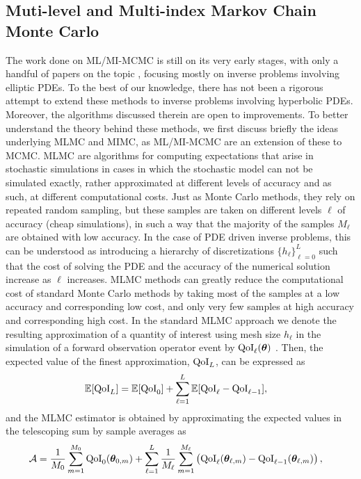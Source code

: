 \subsection{Muti-level and Multi-index Markov Chain Monte Carlo}
The work done on ML/MI-MCMC is still on its very early stages, with only a handful of papers on the topic \cite{dodwell2015hierarchical,hoang2013complexity,jasra2018multi} , focusing mostly on inverse problems involving elliptic PDEs. To the best of our knowledge, there has not been a rigorous attempt to extend these methods to inverse problems involving hyperbolic PDEs. Moreover, the algorithms discussed therein are open to improvements. To better understand the theory behind these methods, we first discuss briefly the ideas underlying  MLMC and MIMC, as ML/MI-MCMC are an extension of these to MCMC.  MLMC are algorithms for computing expectations that arise in stochastic simulations in cases in which the stochastic model can not be simulated exactly, rather approximated at different levels of accuracy and as such, at different computational costs. Just as Monte Carlo methods, they rely on repeated random sampling, but these samples are taken on different levels $\ell$ of accuracy (cheap simulations), in such a way that the majority of the samples $M_\ell$ are obtained with low accuracy. In the case of PDE driven inverse problems, this can be understood as introducing a hierarchy of discretizations $\{h_\ell\}_{\ell=0}^L$ such that the cost of solving the PDE and the accuracy of the numerical solution increase as $\ell$ increases. %
 MLMC methods can greatly reduce the computational cost of standard Monte Carlo methods by taking most of the samples at a low accuracy and corresponding low cost, and only very few samples  at high accuracy and corresponding high cost.   In the standard MLMC approach we denote the resulting approximation of a quantity of interest using mesh size $h_\ell$ in the simulation of a forward observation  operator event by $\text{QoI}_\ell(\bm{\theta})$ . Then, the expected value of the finest approximation, $\text{QoI}_L$, can be expressed as
\begin{align*}
\mathbb{E}[{\text{QoI}_L}] & =
\mathbb{E}[\text{QoI}_0] + \sum_{\ell=1}^L \mathbb{E}[\text{QoI}_{\ell}-\text{QoI}_{\ell-1}],
\end{align*}
and the MLMC estimator is obtained by approximating the expected values
in the telescoping sum by sample averages as
\begin{align}
\label{eq:MLMC_estimator}
\mathcal{A} & = \frac{1}{M_0}\sum_{m=1}^{M_0}\text{QoI}_0(\bm{\theta}_{0,m}) +
\sum_{\ell=1}^L\frac{1}{M_\ell}\sum_{m=1}^{M_\ell}
\left(\text{QoI}_{\ell}(\bm{\theta}_{\ell,m})-\text{QoI}_{\ell-1}(\bm{\theta}_{\ell,m})\right),
\end{align}
